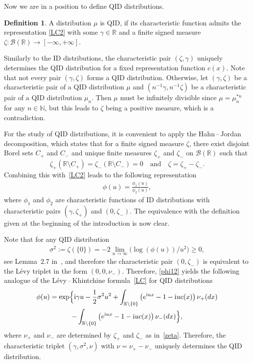 \documentclass[a4paper,11pt]{article}
\theoremstyle{definition}
\newcommand{\R}{{\mathbb{R}}}
\newcommand{\N}{{\mathbb{N}}}
\newcommand{\1}{\mathbb{I}}
\renewcommand{\i}{\mathrm{i}}
\def\R{\mathbb{R}}
\def\N{\mathbb{N}}
\newcommand{\B}{\mathcal{B}}%
\newtheorem{defi}{Definition}
\theoremstyle{remark}
\begin{document}
Now we are in a position to define QID distributions.
\begin{defi} 
A distribution \(\mu\) is QID, if its characteristic function admits the representation \eqref{LC2} with some $\gamma \in \mathbb{R}$ and a finite signed measure $\zeta: \B(\R) \to [-\infty, +\infty]$.
\end{defi}
Similarly to the ID distributions, the characteristic pair $(\zeta, \gamma)$ uniquely determines the QID distribution for a fixed representation function $c(x)$. 
Note that not every pair $(\gamma, \zeta)$ forms a QID distribution. Otherwise, let $(\gamma,\zeta)$ be a characteristic pair of a QID distribution $\mu$ and $(n^{-1}\gamma, n^{-1}\zeta)$ be a characteristic pair of a QID distribution $\mu_n$. Then $\mu$ must be infinitely divisible since $\mu = \mu^{*n}_n$ for any $n \in \N$, but this leads to $\zeta$ being a positive measure, which is a contradiction.

For the study of QID distributions, it is convenient to apply the Hahn\,--\,Jordan decomposition, which states that for a finite signed measure $\zeta$, there exist disjoint Borel sets $C_{+}$ and $C_{-}$ and unique finite measures $\zeta_{+}$ and $\zeta_{-}$ on $\B(\R)$ such that 
\begin{equation*}
    \zeta_{+}(\mathbb{R} \setminus C_{+}) = \zeta_{-}(\mathbb{R} \setminus C_{-}) = 0 \quad \text{and} \quad \zeta = \zeta_{+} - \zeta_{-}.
\end{equation*}
 Combining this with~\eqref{LC2} leads to the following representation 
\begin{eqnarray}\label{phi12}
\phi(u) = \frac{\phi_1(u)}{\phi_2(u)},
\end{eqnarray}
where \(\phi_1\) and \(\phi_2\) are characteristic functions of ID distributions with  characteristic pairs \((\gamma,\zeta_+)\) and \((0,\zeta_-). \) The equivalence with the definition given at the beginning of the introduction is now clear. 

Note that for any QID distribution 
\begin{eqnarray*}
 \sigma^2:= \zeta(\{0\}) = -2 \lim_{u\to \infty} \bigl( \log(\phi(u)) / u^2 \bigr) \geq 0,
\end{eqnarray*}
see Lemma~2.7 in~\cite{LPS2018}, and therefore the characteristic pair \((0, \zeta_{-})\) is equivalent to the L{\'e}vy triplet in the form \((0,0, \nu_{-}).\) Therefore, \eqref{phi12} yields  the following analogue of the L{\'e}vy\,--\,Khintchine formula~\eqref{LC} for QID distributions
\begin{multline} \label{LC3}
    \phi(u)
    =
    \exp\Bigl\{
      \i \gamma u-\frac{1}{2}\sigma^2 u^2
			    +
		    \int_{\mathbb{R}\setminus \{0\}}
		    \left( 
		    		e^{\i u x}-1 - \i u c(x)			\right)			\nu_+(dx)
		\\ -
	    \int_{\mathbb{R}\setminus \{0\}}
		    \left( 
		    		e^{\i u x}-1 - \i u c(x)			\right)			\nu_-(dx)				\Bigr\},
\end{multline}
where \(\nu_+\) and \(\nu_{-}\) are determined by \(\zeta_+\) and \(\zeta_{-}\) as in~\eqref{zeta}.%
 Therefore, the characteristic triplet \((\gamma, \sigma^2, \nu)\) with \(\nu=\nu_+ - \nu_{-}\) uniquely determines the QID distribution.
\end{document}
